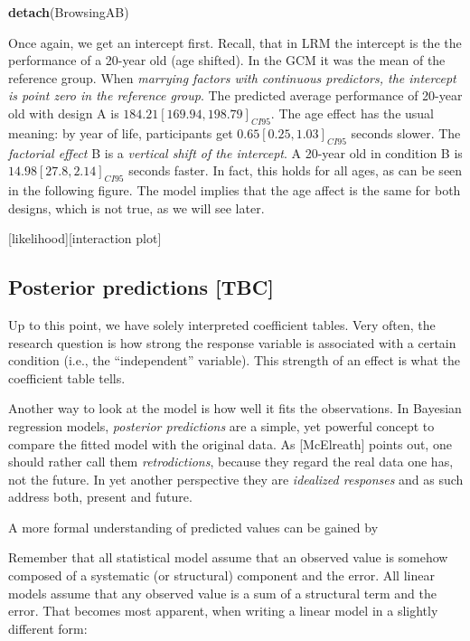 \documentclass[]{svmono}
\newenvironment{Shaded}{\begin{snugshade}}{\end{snugshade}}
\newcommand{\KeywordTok}[1]{\textcolor[rgb]{0.13,0.29,0.53}{\textbf{#1}}}
\newcommand{\NormalTok}[1]{#1}
\begin{document}
\begin{Shaded}
\begin{Highlighting}[]
\KeywordTok{detach}\NormalTok{(BrowsingAB)}
\end{Highlighting}
\end{Shaded}

Once again, we get an intercept first. Recall, that in LRM the intercept
is the the performance of a 20-year old (age shifted). In the GCM it was
the mean of the reference group. When \emph{marrying factors with
continuous predictors, the intercept is point zero in the reference
group}. The predicted average performance of 20-year old with design A
is \(184.21 [169.94, 198.79]_{CI95}\). The age effect has the usual
meaning: by year of life, participants get \(0.65 [0.25, 1.03]_{CI95}\)
seconds slower. The \emph{factorial effect} B is a \emph{vertical shift
of the intercept}. A 20-year old in condition B is
\(14.98 [27.8, 2.14]_{CI95}\) seconds faster. In fact, this holds for
all ages, as can be seen in the following figure. The model implies that
the age affect is the same for both designs, which is not true, as we
will see later.

{[}likelihood{]}{[}interaction plot{]}

\subsection{Posterior predictions
{[}TBC{]}}\label{posterior-predictions-tbc}

Up to this point, we have solely interpreted coefficient tables. Very
often, the research question is how strong the response variable is
associated with a certain condition (i.e., the ``independent''
variable). This strength of an effect is what the coefficient table
tells.

Another way to look at the model is how well it fits the observations.
In Bayesian regression models, \emph{posterior predictions} are a
simple, yet powerful concept to compare the fitted model with the
original data. As {[}McElreath{]} points out, one should rather call
them \emph{retrodictions}, because they regard the real data one has,
not the future. In yet another perspective they are \emph{idealized
responses} and as such address both, present and future.

A more formal understanding of predicted values can be gained by

Remember that all statistical model assume that an observed value is
somehow composed of a systematic (or structural) component and the
error. All linear models assume that any observed value is a sum of a
structural term and the error. That becomes most apparent, when writing
a linear model in a slightly different form:
\end{document}
